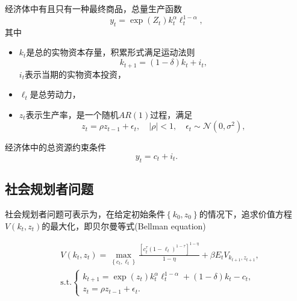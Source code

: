 经济体中有且只有一种最终商品，总量生产函数
\begin{equation}
  \label{eq:pj-solution-example-y}
  y_{t} = \exp \left(Z_{t} \right) k_{t}^{\alpha} \ell_{t}^{1 - \alpha},
\end{equation}
其中\begin{itemize}
\item $k_{t}$是总的实物资本存量，积累形式满足运动法则
\begin{equation*}
  k_{t+1} = \left( 1 - \delta \right) k_{t} + i_{t},
\end{equation*}
$i_{t}$表示当期的实物资本投资，
\item $\ell_{t}$是总劳动力，
\item $z_{t}$表示生产率，是一个随机$AR(1)$过程，满足
\begin{equation*}
  z_{t} = \rho z_{t-1} + \epsilon_{t}, \quad \left| \rho \right| < 1, \quad \epsilon_{t} \sim \mathcal{N} \left( 0, \sigma^{2} \right),
\end{equation*}
\end{itemize}

经济体中的总资源约束条件
\begin{equation*}
  y_{t} = c_{t} + i_{t}.
\end{equation*}

\subsection{社会规划者问题}
\label{sec:pj-example-bellmann}
社会规划者问题可表示为，在给定初始条件$\left\{k_{0}, z_{0} \right\}$的情况下，追求价值方程$V \left( k_{t}, z_{t} \right)$的最大化，即贝尔曼等式(Bellman equation)

\begin{equation}
  \label{eq:pj-example-bellmann}
  \begin{split}
    & V \left( k_{t}, z_{t} \right)
    = \max_{\left\{ c_{t}, \ell_{t} \right\}}
    \frac{
    \left[
    c_{t}^{\tau} \left( 1 - \ell_{t} \right)^{1 - \tau}
    \right]^{1 - \eta}
    }{1 - \eta}
    + \beta E_{t} V_{k_{t+1}, z_{t+1}},\\
    & \text{s.t.} \begin{cases}
    k_{t+1} = \exp \left( z_{t} \right) k_{t}^{\alpha} \ell_{t}^{1 - \alpha} + \left( 1 - \delta \right) k_{t} - c_{t}, \\
    z_{t} = \rho z_{t-1} + \epsilon_{t}.
    \end{cases}
  \end{split}
\end{equation}

